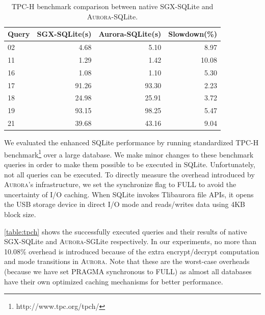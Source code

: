 \begin{table}	
	\centering
	\caption{TPC-H benchmark comparison between native SGX-SQLite and \textsc{Aurora}-SQLite.}
	\label{table:tpch}
	\small
	\begin{tabular}{lrrr}
		\toprule
		\textbf{Query} & \textbf{SGX-SQLite(s)} & \textbf{Aurora-SQLite(s)} & \textbf{Slowdown(\%)} \\
		\midrule
		02 & 4.68 & 5.10 & 8.97 \\
		11 & 1.29 & 1.42 & 10.08 \\
		16 & 1.08 & 1.10 & 5.30 \\
		17 & 91.26 & 93.30 & 2.23 \\
		18 & 24.98 & 25.91 & 3.72 \\
		19 & 93.15 & 98.25 & 5.47 \\
		21 & 39.68 & 43.16 & 9.04 \\
		\bottomrule
	\end{tabular}
\end{table}

We evaluated the enhanced SQLite performance by running standardized TPC-H benchmark\footnote{http://www.tpc.org/tpch/} over a large database. %
We make minor changes to these benchmark queries in order to make them possible to be executed in SQLite. Unfortunately, not all queries can be executed.
To directly measure the overhead introduced by \textsc{Aurora}'s infrastructure, we set the synchronize flag to \textsf{FULL} to avoid the uncertainty of I/O caching. When SQLite invokes Tlibaurora file APIs, it opens the USB storage device in direct I/O mode and reads/writes data using 4KB block size.

\autoref{table:tpch} shows the successfully executed queries and their results of native SGX-SQLite and \textsc{Aurora}-SGLite respectively. In our experiments, no more than 10.08\% overhead is introduced because of the extra encrypt/decrypt computation and mode transitions in \textsc{Aurora}.
Note that these are the worst-case overheads (because we have set \textsf{PRAGMA synchronous} to \textsf{FULL}) as almost all databases have their own optimized caching mechanisms for better performance.

